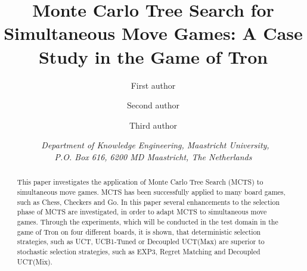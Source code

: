 \documentclass{article}
\title{\textbf{\huge Monte Carlo Tree Search for Simultaneous Move Games: A Case Study in the Game of Tron}}
\author{First author \affila \and
    Second author \affila \and
    Third author \affila}
\date{\affila\ \textit{Department of Knowledge Engineering, Maastricht University,\\ P.O. Box 616, 6200 MD Maastricht, The Netherlands}}
\begin{document}
\ttl
\thispagestyle{empty}



\begin{abstract}
\noindent This paper investigates the application of Monte Carlo Tree Search (MCTS) to simultaneous move games. MCTS has been successfully applied to many board games, such as Chess, Checkers and Go. In this paper several enhancements to the selection phase of MCTS are investigated, in order to adapt MCTS to simultaneous move games. Through the experiments, which will be conducted in the test domain in the game of Tron on four different boards, it is shown, that deterministic selection strategies, such as UCT, UCB1-Tuned or Decoupled UCT(Max) are superior to stochastic selection strategies, such as EXP3, Regret Matching and Decoupled UCT(Mix).
\end{abstract}
\end{document}
